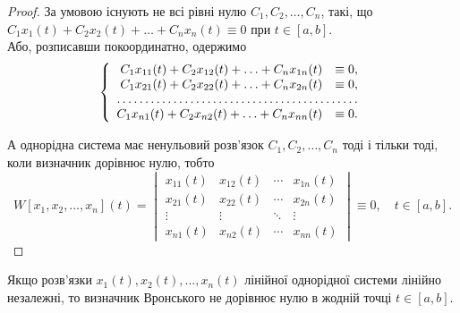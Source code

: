 \begin{proof}
	За умовою існують не всі рівні нулю $C_1, C_2, \ldots, C_n$, такі, що $C_1 x_1(t) + C_2 x_2(t) + \ldots + C_n x_n(t) \equiv 0$ при $t \in [a, b]$. \\

	Або, розписавши покоординатно, одержимо
	\begin{equation*}
		\left\{
			\begin{array}{rl}
				C_1 x_{11}(t) + C_2 x_{12}(t) + \ldots + C_n x_{1n}(t) &\equiv 0, \\
				C_1 x_{21}(t) + C_2 x_{22}(t) + \ldots + C_n x_{2n}(t) &\equiv 0, \\
				\hdotsfor{2} \\
				C_1 x_{n1}(t) + C_2 x_{n2}(t) + \ldots + C_n x_{nn}(t) &\equiv 0.
			\end{array}
		\right.
	\end{equation*}

	А однорідна система має ненульовий розв'язок $C_1, C_2, \ldots, C_n$ тоді і тільки тоді, коли визначник дорівнює нулю, тобто
	\begin{equation*}
		W[x_1, x_2, \ldots, x_n](t) = \begin{vmatrix} x_{11}(t) & x_{12}(t) & \cdots & x_{1n}(t) \\ x_{21}(t) & x_{22}(t) & \cdots & x_{2n}(t) \\ \vdots & \vdots & \ddots & \vdots \\ x_{n1}(t) & x_{n2}(t) & \cdots & x_{nn}(t) \end{vmatrix} \equiv 0, \quad t \in [a, b].
	\end{equation*}
\end{proof}

\begin{theorem}
	Якщо розв'язки $x_1(t), x_2(t), \ldots, x_n(t)$ лінійної однорідної системи лінійно незалежні, то визначник Вронського не дорівнює нулю в жодній точці $t \in [a, b]$. 
\end{theorem}

